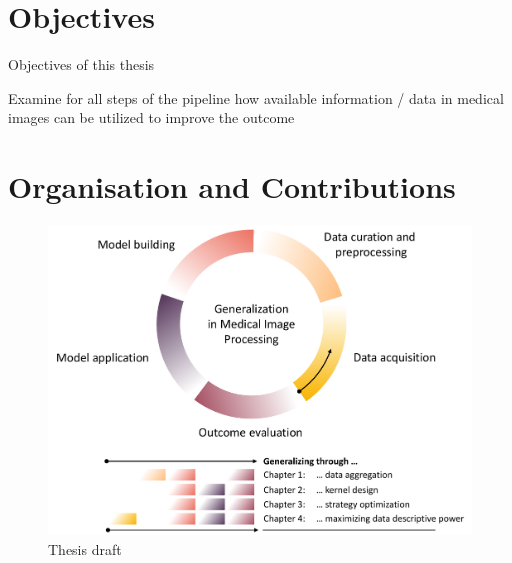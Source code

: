 \section{Objectives}

Objectives of this thesis

Examine for all steps of the pipeline how available information / data in medical images can be utilized to improve the outcome

\section{Organisation and Contributions}

    \begin{figure}
        \label{fig:draft}
        \includegraphics[width=\textwidth]{sections/01_introduction/figures/draft.pdf}
        \caption{Thesis draft}

    \end{figure}